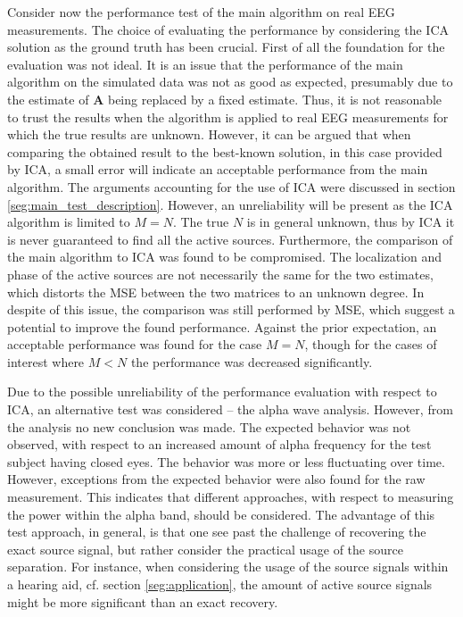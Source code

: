 Consider now the performance test of the main algorithm on real EEG measurements. 
The choice of evaluating the performance by considering the ICA solution as the ground truth has been crucial. 
First of all the foundation for the evaluation was not ideal. 
It is an issue that the performance of the main algorithm on the simulated data was not as good as expected, presumably due to the estimate of $\mathbf{A}$ being replaced by a fixed estimate. 
Thus, it is not reasonable to trust the results when the algorithm is applied to real EEG measurements for which the true results are unknown. 
However, it can be argued that when comparing the obtained result to the best-known solution, in this case provided by ICA, a small error will indicate an acceptable performance from the main algorithm. 
The arguments accounting for the use of ICA were discussed in section \ref{seg:main_test_description}. 
However, an unreliability will be present as the ICA algorithm is limited to $M = N$. 
The true $N$ is in general unknown, thus by ICA it is never guaranteed to find all the active sources.
Furthermore, the comparison of the main algorithm to ICA was found to be compromised. 
The localization and phase of the active sources are not necessarily the same for the two estimates, which distorts the MSE between the two matrices to an unknown degree.
In despite of this issue, the comparison was still performed by MSE, which suggest a potential to improve the found performance. 
Against the prior expectation, an acceptable performance was found for the case $M = N$, though for the cases of interest where $M < N$ the performance was decreased significantly.    

Due to the possible unreliability of the performance evaluation with respect to ICA, an alternative test was considered -- the alpha wave analysis. 
However, from the analysis no new conclusion was made. The expected behavior was not observed, with respect to an increased amount of alpha frequency for the test subject having closed eyes.
The behavior was more or less fluctuating over time. However, exceptions from the expected behavior were also found for the raw measurement. This indicates that different approaches, with respect to measuring the power within the alpha band, should be considered.
The advantage of this test approach, in general, is that one see past the challenge of recovering the exact source signal, but rather consider the practical usage of the source separation. For instance, when considering the usage of the source signals within a hearing aid, cf. section \ref{seg:application}, the amount of active source signals might be more significant than an exact recovery.         

